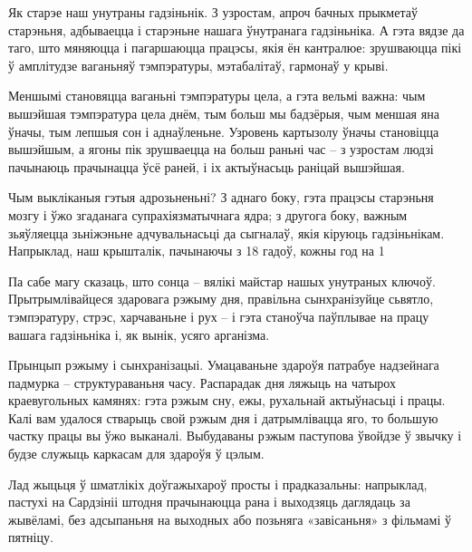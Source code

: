 Як старэе наш унутраны гадзіньнік. З узростам, апроч бачных прыкметаў старэньня, адбываецца і старэньне нашага ўнутранага гадзіньніка. А гэта вядзе да таго, што мяняюцца і пагаршаюцца працэсы, якія ён кантралюе: зрушваюцца пікі ў амплітудзе ваганьняў тэмпэратуры, мэтабалітаў, гармонаў у крыві.

Меншымі становяцца ваганьні тэмпэратуры цела, а гэта вельмі важна: чым вышэйшая тэмпэратура цела днём, тым больш мы бадзёрыя, чым меншая яна ўначы, тым лепшыя сон і аднаўленьне. Узровень картызолу ўначы становіцца вышэйшым, а ягоны пік зрушваецца на больш раньні час – з узростам людзі пачынаюць прачынацца ўсё раней, і іх актыўнасьць раніцай вышэйшая.

Чым выкліканыя гэтыя адрозьненьні? З аднаго боку, гэта працэсы старэньня мозгу і ўжо згаданага супрахіязматычнага ядра; з другога боку, важным зьяўляецца зьніжэньне адчувальнасьці да сыгналаў, якія кіруюць гадзіньнікам. Напрыклад, наш крышталік, пачынаючы з 18 гадоў, кожны год на 1%

Па сабе магу сказаць, што сонца – вялікі майстар нашых унутраных ключоў. Прытрымлівайцеся здаровага рэжыму дня, правільна сынхранізуйце сьвятло, тэмпэратуру, стрэс, харчаваньне і рух – і гэта станоўча паўплывае на працу вашага гадзіньніка і, як вынік, усяго арганізма.

Прынцып рэжыму і сынхранізацыі. Умацаваньне здароўя патрабуе надзейнага падмурка – структураваньня часу. Распарадак дня ляжыць на чатырох краевугольных камянях: гэта рэжым сну, ежы, рухальнай актыўнасьці і працы. Калі вам удалося стварыць свой рэжым дня і датрымлівацца яго, то большую частку працы вы ўжо выканалі. Выбудаваны рэжым паступова ўвойдзе ў звычку і будзе служыць каркасам для здароўя ў цэлым.

Лад жыцьця ў шматлікіх доўгажыхароў просты і прадказальны: напрыклад, пастухі на Сардзініі штодня прачынаюцца рана і выходзяць даглядаць за жывёламі, без адсыпаньня на выходных або позьняга «завісаньня» з фільмамі ў пятніцу.

